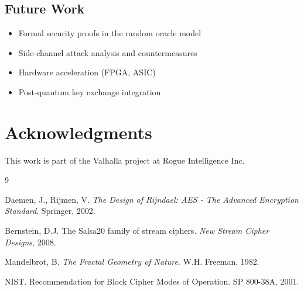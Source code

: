 \documentclass[11pt,a4paper]{article}
\begin{document}
\subsection{Future Work}

\begin{itemize}
    \item Formal security proofs in the random oracle model
    \item Side-channel attack analysis and countermeasures
    \item Hardware acceleration (FPGA, ASIC)
    \item Post-quantum key exchange integration
\end{itemize}

\section*{Acknowledgments}

This work is part of the Valhalla project at Rogue Intelligence Inc.


\begin{thebibliography}{9}

Daemen, J., Rijmen, V.
\textit{The Design of Rijndael: AES - The Advanced Encryption Standard}.
Springer, 2002.

Bernstein, D.J.
The Salsa20 family of stream ciphers.
\textit{New Stream Cipher Designs}, 2008.

Mandelbrot, B.
\textit{The Fractal Geometry of Nature}.
W.H. Freeman, 1982.

NIST.
Recommendation for Block Cipher Modes of Operation.
SP 800-38A, 2001.

\end{thebibliography}
\end{document}
